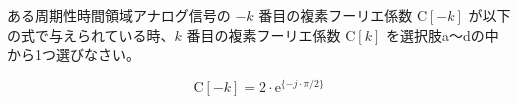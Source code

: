 ある周期性時間領域アナログ信号の $-k$ 番目の複素フーリエ係数 $\textrm{C}[-k]$ が以下の式で与えられている時、$k$ 番目の複素フーリエ係数 $\textrm{C}[k]$ を選択肢a〜dの中から1つ選びなさい。

\[
\textrm{C}[-k] = 2 \cdot \textrm{e}^{\{ -j \cdot \pi/2 \}}
\]
